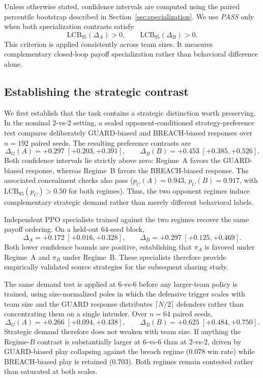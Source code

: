 Unless otherwise stated, confidence intervals are computed using the paired
percentile bootstrap described in Section~\ref{sec:specialization}. We use
\emph{PASS} only when both specialization contrasts satisfy
\[
    \mathrm{LCB}_{95}(\Delta_A)>0,
    \qquad
    \mathrm{LCB}_{95}(\Delta_B)>0.
\]
This criterion is applied consistently across team sizes. It measures
complementary closed-loop payoff specialization rather than behavioral
difference alone.

\subsection{Establishing the strategic contrast}
\label{sec:exp-demand}

We first establish that the task contains a strategic distinction worth
preserving. In the nominal $2$-vs-$2$ setting, a sealed
opponent-conditioned strategy-preference test compares deliberately
GUARD-biased and BREACH-biased responses over $n=192$ paired seeds. The
resulting preference contrasts are
\[
    \Delta_G(A)=+0.297\;[+0.203,+0.391],
    \qquad
    \Delta_B(B)=+0.453\;[+0.385,+0.526].
\]
Both confidence intervals lie strictly above zero: Regime~A favors the
GUARD-biased response, whereas Regime~B favors the BREACH-biased response.
The associated concealment checks also pass
($p_C(A)=0.943$, $p_C(B)=0.917$, with
$\mathrm{LCB}_{95}(p_C)>0.50$ for both regimes). Thus, the two opponent
regimes induce complementary strategic demand rather than merely different
behavioral labels.

Independent PPO specialists trained against the two regimes recover the same
payoff ordering. On a held-out $64$-seed block,
\[
    \Delta_A=+0.172\;[+0.016,+0.328],
    \qquad
    \Delta_B=+0.297\;[+0.125,+0.469].
\]
Both lower confidence bounds are positive, establishing that $\pi_A$ is
favored under Regime~A and $\pi_B$ under Regime~B. These specialists therefore
provide empirically validated source strategies for the subsequent sharing
study.

The same demand test is applied at $6$-vs-$6$ before any larger-team policy is
trained, using size-normalized poles in which the defensive trigger scales with
team size and the GUARD response distributes $\lceil N/2 \rceil$ defenders
rather than concentrating them on a single intruder. Over $n=64$ paired seeds,
\[
    \Delta_G(A)=+0.266\;[+0.094,+0.438],
    \qquad
    \Delta_B(B)=+0.625\;[+0.484,+0.750].
\]
Strategic demand therefore does not weaken with team size. If anything the
Regime-$B$ contrast is substantially larger at $6$-vs-$6$ than at $2$-vs-$2$,
driven by GUARD-biased play collapsing against the breach regime
($0.078$ win rate) while BREACH-biased play is retained ($0.703$). Both
regimes remain contested rather than saturated at both scales.

